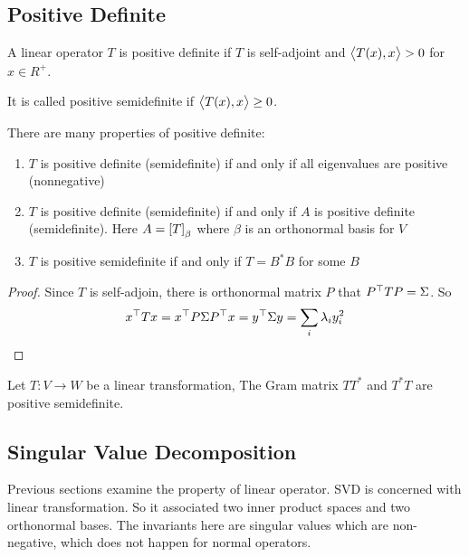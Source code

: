 \subsection{Positive Definite}

\begin{definition}
    A linear operator $T$ is positive definite if $T$ is self-adjoint and $\left\langle \displaystyle T(x), x \right\rangle > 0$ for $x \in R^+$.
    
    It is called positive semidefinite if $\left\langle \displaystyle T(x), x \right\rangle \geq 0$.
\end{definition}


There are many properties of positive definite:
\begin{enumerate}
    \item $T$ is positive definite (semidefinite) if and only if all eigenvalues are positive (nonnegative)
    \item $T$ is positive definite (semidefinite) if and only if $A$ is positive definite (semidefinite). Here $A = \coordinate{T}_\beta $ where $\beta$ is an orthonormal basis for $V$
    \item $T$ is positive semidefinite if and only if $T = B^*B$ for some $B$
\end{enumerate}
\begin{proof}
    Since $T$ is self-adjoin, there is orthonormal matrix $P$ that ${P}^\top T P = \Sigma$. So
    \begin{equation*}
        {x}^\top T x = {x}^\top P \Sigma {P}^\top x = {y}^\top \Sigma y = \sum_i \lambda_i y_i^2
    \end{equation*}
\end{proof}


\begin{theorem}\label{tt_positive_semidefinite}
    Let $T:V \rightarrow W$ be a linear transformation, The Gram matrix $TT^*$ and $T^*T$ are positive semidefinite.
\end{theorem}




\subsection{Singular Value Decomposition}

Previous sections examine the property of linear operator. SVD is concerned with linear transformation. So it associated two inner product spaces and two orthonormal bases. The invariants here are singular values which are non-negative, which does not happen for normal operators.

